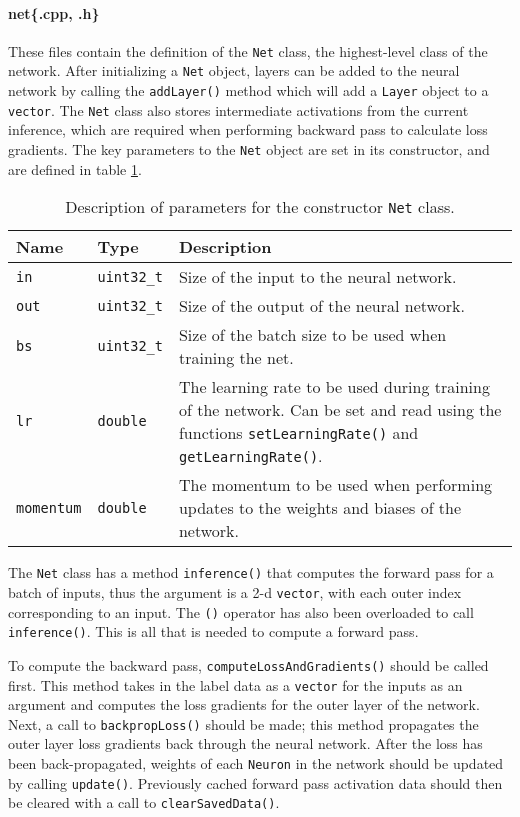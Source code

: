 \paragraph{net\{.cpp, .h\}}
These files contain the definition of the \texttt{Net} class, the highest-level class of the network. After initializing a \texttt{Net} object, layers can be added to the neural network by calling the \texttt{addLayer()} method which will add a \texttt{Layer} object to a \texttt{vector}. The \texttt{Net} class also stores intermediate activations from the current inference, which are required when performing backward pass to calculate loss gradients. The key parameters to the \texttt{Net} object are set in its constructor, and are defined in table \ref{nettable}. 
\begin{table}
	\centering
	\begin{tabularx}{\textwidth}{|l|l|X|}
		\hline
		\textbf{Name} 			& \textbf{Type} 		& \textbf{Description} \\\hline
		\texttt{in}  			& \texttt{uint32\_t}	& Size of the input to the neural network.\\\hline
		\texttt{out}			& \texttt{uint32\_t}	& Size of the output of the neural network. \\\hline 
		\texttt{bs}				& \texttt{uint32\_t}	& Size of the batch size to be used when training the net.\\\hline 
		\texttt{lr}				& \texttt{double}	& The learning rate to be used during training of the network. Can be set and read using the functions \texttt{setLearningRate()} and \texttt{getLearningRate()}. \\\hline 
		\texttt{momentum}		& \texttt{double}	& The momentum to be used when performing updates to the weights and biases of the network.
		\\\hline
	\end{tabularx}
	\caption{Description of parameters for the constructor \texttt{Net} class.}
	\label{nettable}
\end{table}
\par 
The \texttt{Net} class has a method \texttt{inference()} that computes the forward pass for a batch of inputs, thus the argument is a 2-d \texttt{vector}, with each outer index corresponding to an input. The \texttt{()} operator has also been overloaded to call \texttt{inference()}. This is all that is needed to compute a forward pass.
\par 
To compute the backward pass, \texttt{computeLossAndGradients()} should be called first. This method takes in the label data as a \texttt{vector} for the inputs as an argument and computes the loss gradients for the outer layer of the network. Next, a call to \texttt{backpropLoss()} should be made; this method propagates the outer layer loss gradients back through the neural network. After the loss has been back-propagated, weights of each \texttt{Neuron} in the network should be updated by calling \texttt{update()}. Previously cached forward pass activation data should then be cleared with a call to \texttt{clearSavedData()}.
